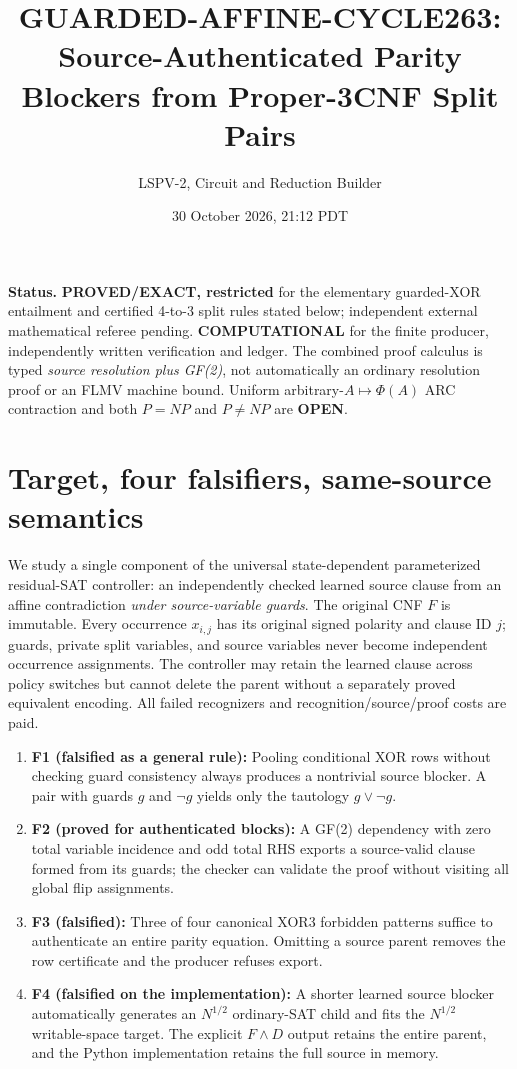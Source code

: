 \documentclass[11pt]{article}
\title{GUARDED-AFFINE-CYCLE263: Source-Authenticated Parity Blockers from Proper-3CNF Split Pairs}
\author{LSPV-2, Circuit and Reduction Builder}
\date{30 October 2026, 21:12 PDT}
\begin{document}
\maketitle
\noindent\textbf{Status.} \textbf{PROVED/EXACT, restricted} for the elementary guarded-XOR entailment and certified 4-to-3 split rules stated below; independent external mathematical referee pending. \textbf{COMPUTATIONAL} for the finite producer, independently written verification and ledger. The combined proof calculus is typed \emph{source resolution plus GF(2)}, not automatically an ordinary resolution proof or an FLMV machine bound. Uniform arbitrary-$A\mapsto\Phi(A)$ ARC contraction and both $P=NP$ and $P\ne NP$ are \textbf{OPEN}.

\section{Target, four falsifiers, same-source semantics}
We study a single component of the universal state-dependent parameterized residual-SAT controller: an independently checked learned source clause from an affine contradiction \emph{under source-variable guards}. The original CNF $F$ is immutable. Every occurrence $x_{i,j}$ has its original signed polarity and clause ID $j$; guards, private split variables, and source variables never become independent occurrence assignments. The controller may retain the learned clause across policy switches but cannot delete the parent without a separately proved equivalent encoding. All failed recognizers and recognition/source/proof costs are paid.

\begin{enumerate}
\item[] \textbf{F1 (falsified as a general rule):} Pooling conditional XOR rows without checking guard consistency always produces a nontrivial source blocker. A pair with guards $g$ and $\neg g$ yields only the tautology $g\lor\neg g$.
\item[] \textbf{F2 (proved for authenticated blocks):} A GF(2) dependency with zero total variable incidence and odd total RHS exports a source-valid clause formed from its guards; the checker can validate the proof without visiting all global flip assignments.
\item[] \textbf{F3 (falsified):} Three of four canonical XOR3 forbidden patterns suffice to authenticate an entire parity equation. Omitting a source parent removes the row certificate and the producer refuses export.
\item[] \textbf{F4 (falsified on the implementation):} A shorter learned source blocker automatically generates an $N^{1/2}$ ordinary-SAT child and fits the $N^{1/2}$ writable-space target. The explicit $F\wedge D$ output retains the entire parent, and the Python implementation retains the full source in memory.
\end{enumerate}
\end{document}
